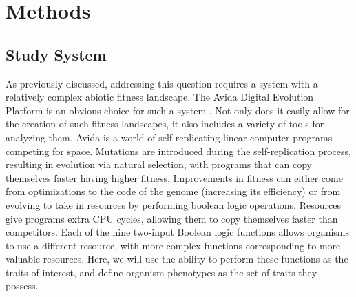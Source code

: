 \documentclass[letterpaper]{article}
\begin{document}
\section{Methods}

\subsection{Study System}
As previously discussed, addressing this question requires a system with a relatively complex abiotic fitness landscape. The Avida Digital Evolution Platform is an obvious choice for such a system \citep{ofria_avida:_2004}. Not only does it easily allow for the creation of such fitness landscapes, it also includes a variety of tools for analyzing them. Avida is a world of self-replicating linear computer programs competing for space. Mutations are introduced during the self-replication process, resulting in evolution via natural selection, with programs that can copy themselves faster having higher fitness. Improvements in fitness can either come from optimizations to the code of the genome (increasing its efficiency) or from evolving to take in resources by performing boolean logic operations. Resources give programs extra CPU cycles, allowing them to copy themselves faster than competitors. Each of the nine two-input Boolean logic functions allows organisms to use a different resource, with more complex functions corresponding to more valuable resources. Here, we will use the ability to perform these functions as the traits of interest, and define organism phenotypes as the set of traits they possess.
\end{document}
